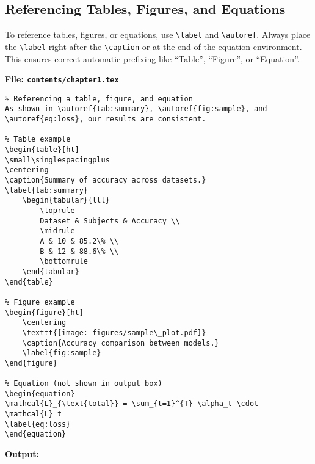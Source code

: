 \documentclass{VISTEC}
\begin{document}
\subsection{Referencing Tables, Figures, and Equations}
\label{manual:ref-table-figure}

\begin{subparagraph}
To reference tables, figures, or equations, use \verb|\label| and \verb|\autoref|. Always place the \verb|\label| right after the \verb|\caption| or at the end of the equation environment. This ensures correct automatic prefixing like ``Table'', ``Figure'', or ``Equation''.
\end{subparagraph}

\noindent\textbf{File: \texttt{contents/chapter1.tex}}\vspace{-1.5em}
\begin{verbatim}
% Referencing a table, figure, and equation
As shown in \autoref{tab:summary}, \autoref{fig:sample}, and \autoref{eq:loss}, our results are consistent.

% Table example
\begin{table}[ht]
\small\singlespacingplus
\centering
\caption{Summary of accuracy across datasets.}
\label{tab:summary}
    \begin{tabular}{lll}
        \toprule
        Dataset & Subjects & Accuracy \\
        \midrule
        A & 10 & 85.2\% \\
        B & 12 & 88.6\% \\
        \bottomrule
    \end{tabular}
\end{table}

% Figure example
\begin{figure}[ht]
    \centering
    \texttt{[image: figures/sample\_plot.pdf]}
    \caption{Accuracy comparison between models.}
    \label{fig:sample}
\end{figure}

% Equation (not shown in output box)
\begin{equation}
\mathcal{L}_{\text{total}} = \sum_{t=1}^{T} \alpha_t \cdot \mathcal{L}_t
\label{eq:loss}
\end{equation}
\end{verbatim}

\textbf{Output:}\vspace{0.5em}
\end{document}
